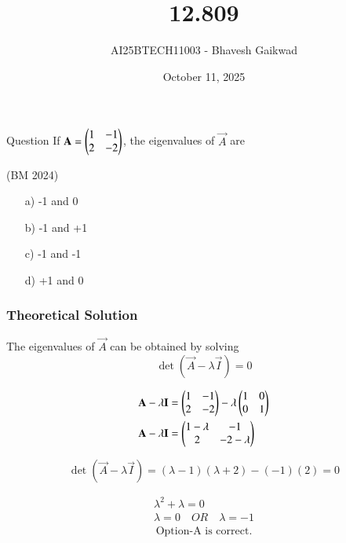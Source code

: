 \documentclass{beamer}
\title
{12.809}
\date{October 11, 2025}
\author 
{AI25BTECH11003 - Bhavesh Gaikwad}
\begin{document}
\frame{\titlepage}
\begin{frame}{Question}
If $\mathbf{A} = \begin{pmatrix}1 & -1 \\ 2 & -2\end{pmatrix}$, the eigenvalues of $\vec{A}$ are 

\hfill{(BM 2024)}

\begin{itemize}
    \item[a)]-1 and 0
    \item[b)]-1 and +1
    \item[c)]-1 and -1
    \item[d)]+1 and 0
\end{itemize}

\end{frame}


\begin{frame}[fragile]
    \frametitle{Theoretical Solution}
The eigenvalues of $\vec{A}$ can be obtained by solving
\begin{equation}
    \det(\vec{A} - \lambda\vec{I}) = 0 
\end{equation}

\begin{align}
 \mathbf{A} - \lambda\mathbf{I} &= \begin{pmatrix}1 & -1 \\ 2 & -2\end{pmatrix} - \lambda\begin{pmatrix}1 & 0 \\ 0 & 1\end{pmatrix}\\
 \mathbf{A} - \lambda\mathbf{I} &= \begin{pmatrix}1-\lambda & -1 \\ 2 & -2-\lambda\end{pmatrix}
\end{align}

\begin{equation}
    \det(\vec{A} - \lambda\vec{I}) = (\lambda - 1)(\lambda + 2) - (-1)(2) = 0 
\end{equation}

\begin{align}
    \lambda^2 + \lambda = 0 \\
    \lambda = 0 \quad OR \quad \lambda = -1
\end{align}
    \begin{align*}
        \boxed{\text{Option-A is correct.}}
    \end{align*}
\end{frame}
\end{document}
